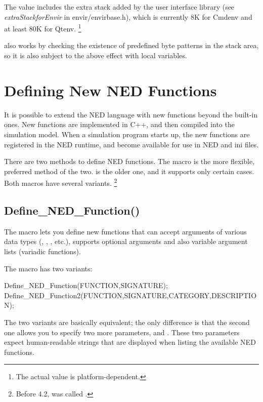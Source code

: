 The value includes the extra stack added by the user interface library
(see \textit{extraStackforEnvir} in
envir/envirbase.h), which is currently 8K for Cmdenv and at least 80K
for Qtenv.
  \footnote{The actual value is platform-dependent.}

 also works by checking the existence of predefined
byte patterns in the stack area, so it is also subject to the above
effect with local variables.


\section{Defining New NED Functions}
\label{sec:sim-lib:defining-ned-functions}

It is possible to extend the NED language with new functions beyond the
built-in ones. New functions are implemented in C++, and then compiled into
the simulation model. When a simulation program starts up, the new
functions are registered in the NED runtime, and become available for use
in NED and ini files.

There are two methods to define NED functions. The
 macro is the more flexible, preferred method
of the two.  is the older one, and it
supports only certain cases. Both macros have several variants.
  \footnote{Before {\opp} 4.2,  was
  called .}

\subsection{Define\_NED\_Function()}
\label{sec:sim-lib:define-ned-function-macro}

The  macro lets you define new functions that
can accept arguments of various data types (, ,
, etc.), supports optional arguments and also variable
argument lists (variadic functions).

The macro has two variants:

\begin{cpp}
Define_NED_Function(FUNCTION,SIGNATURE);
Define_NED_Function2(FUNCTION,SIGNATURE,CATEGORY,DESCRIPTION);
\end{cpp}

The two variants are basically equivalent; the only difference is that the
second one allows you to specify two more parameters,  and
. These two parameters expect human-readable strings that
are displayed when listing the available NED functions.

